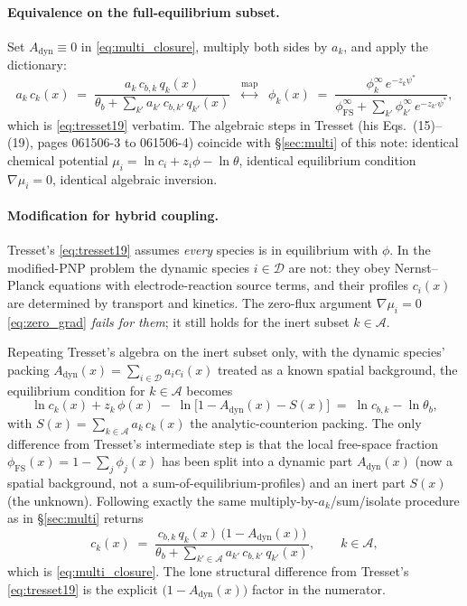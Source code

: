 \documentclass[11pt]{article}
\newcommand{\dynset}{\mathcal{D}}      %
\newcommand{\anset}{\mathcal{A}}       %
\begin{document}
\paragraph{Equivalence on the full-equilibrium subset.}
Set $A_{\mathrm{dyn}}\equiv 0$ in \eqref{eq:multi_closure}, multiply
both sides by $a_k$, and apply the dictionary:
\begin{equation}
a_k\,c_k(x)
\;=\;
\frac{a_k\,c_{b,k}\,q_k(x)}
     {\theta_b + \sum_{k'} a_{k'}\,c_{b,k'}\,q_{k'}(x)}
\;\;\overset{\text{map}}{\longleftrightarrow}\;\;
\phi_k(x)
\;=\;
\frac{\phi_k^\infty\,e^{-z_k\psi^*}}
     {\phi_{\mathrm{FS}}^\infty + \sum_{k'} \phi_{k'}^\infty\,e^{-z_{k'}\psi^*}},
\end{equation}
which is \eqref{eq:tresset19} verbatim. The algebraic steps in
Tresset (his Eqs.~(15)--(19), pages 061506-3 to 061506-4) coincide
with \S\ref{sec:multi} of this note: identical chemical potential
$\mu_i = \ln c_i + z_i\phi - \ln\theta$, identical equilibrium
condition $\nabla\mu_i = 0$, identical algebraic inversion.

\paragraph{Modification for hybrid coupling.}
Tresset's \eqref{eq:tresset19} assumes \emph{every} species is in
equilibrium with $\phi$. In the modified-PNP problem the dynamic
species $i \in \dynset$ are not: they obey Nernst--Planck equations
with electrode-reaction source terms, and their profiles
$c_i(x)$ are determined by transport and kinetics. The zero-flux
argument $\nabla\mu_i = 0$ \eqref{eq:zero_grad} \emph{fails for
them}; it still holds for the inert subset $k \in \anset$.

Repeating Tresset's algebra on the inert subset only, with the
dynamic species' packing $A_{\mathrm{dyn}}(x) =
\sum_{i\in\dynset} a_i c_i(x)$ treated as a known spatial
background, the equilibrium condition for $k \in \anset$ becomes
\begin{equation}
\ln c_k(x) + z_k\,\phi(x)
\;-\; \ln\bigl[1 - A_{\mathrm{dyn}}(x) - S(x)\bigr]
\;=\; \ln c_{b,k} - \ln\theta_b,
\label{eq:hybrid_equilibrium}
\end{equation}
with $S(x) = \sum_{k\in\anset} a_k\,c_k(x)$ the analytic-counterion
packing. The only difference from Tresset's intermediate step is
that the local free-space fraction
$\phi_{\mathrm{FS}}(x) = 1 - \sum_j \phi_j(x)$ has been split into
a dynamic part $A_{\mathrm{dyn}}(x)$ (now a spatial background, not
a sum-of-equilibrium-profiles) and an inert part $S(x)$ (the
unknown). Following exactly the same multiply-by-$a_k$/sum/isolate
procedure as in \S\ref{sec:multi} returns
\begin{equation}
c_k(x) \;=\;
\frac{c_{b,k}\,q_k(x)\,\bigl(1 - A_{\mathrm{dyn}}(x)\bigr)}
     {\theta_b + \sum_{k'\in\anset} a_{k'}\,c_{b,k'}\,q_{k'}(x)},
\qquad k\in\anset,
\label{eq:hybrid_closure}
\end{equation}
which is \eqref{eq:multi_closure}. The lone structural difference
from Tresset's \eqref{eq:tresset19} is the explicit
$\bigl(1 - A_{\mathrm{dyn}}(x)\bigr)$ factor in the numerator.
\end{document}
